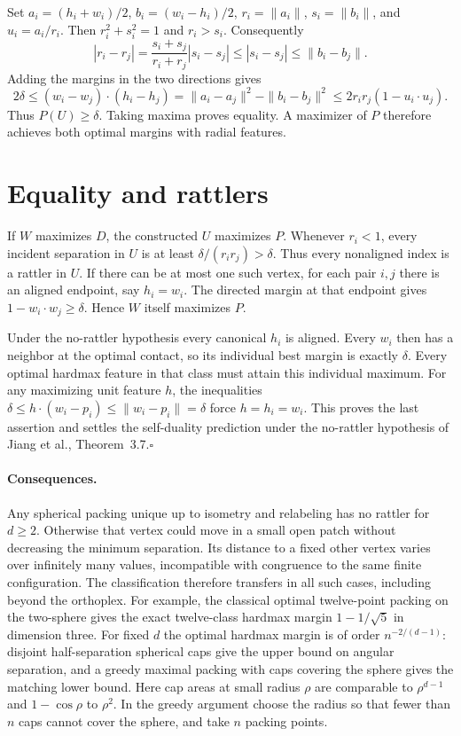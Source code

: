 \documentclass[11pt]{article}
\begin{document}
Set $a_i=(h_i+w_i)/2$, $b_i=(w_i-h_i)/2$, $r_i=\|a_i\|$, $s_i=\|b_i\|$, and $u_i=a_i/r_i$. Then $r_i^2+s_i^2=1$ and $r_i>s_i$. Consequently
\[
 |r_i-r_j|=\frac{s_i+s_j}{r_i+r_j}|s_i-s_j|
 \le |s_i-s_j|\le\|b_i-b_j\|.
\]
Adding the margins in the two directions gives
\[
 2\delta\le (w_i-w_j)\cdot(h_i-h_j)
 =\|a_i-a_j\|^2-\|b_i-b_j\|^2
 \le 2r_i r_j(1-u_i\cdot u_j).
\]
Thus $P(U)\ge\delta$. Taking maxima proves equality. A maximizer of $P$ therefore achieves both optimal margins with radial features.

\section*{Equality and rattlers}
If $W$ maximizes $D$, the constructed $U$ maximizes $P$. Whenever $r_i<1$, every incident separation in $U$ is at least $\delta/(r_ir_j)>\delta$. Thus every nonaligned index is a rattler in $U$. If there can be at most one such vertex, for each pair $i,j$ there is an aligned endpoint, say $h_i=w_i$. The directed margin at that endpoint gives $1-w_i\cdot w_j\ge\delta$. Hence $W$ itself maximizes $P$.

Under the no-rattler hypothesis every canonical $h_i$ is aligned. Every $w_i$ then has a neighbor at the optimal contact, so its individual best margin is exactly $\delta$. Every optimal hardmax feature in that class must attain this individual maximum. For any maximizing unit feature $h$, the inequalities $\delta\le h\cdot(w_i-p_i)\le\|w_i-p_i\|=\delta$ force $h=h_i=w_i$. This proves the last assertion and settles the self-duality prediction under the no-rattler hypothesis of Jiang et al., Theorem~3.7.\hfill$\square$

\paragraph{Consequences.} Any spherical packing unique up to isometry and relabeling has no rattler for $d\ge2$. Otherwise that vertex could move in a small open patch without decreasing the minimum separation. Its distance to a fixed other vertex varies over infinitely many values, incompatible with congruence to the same finite configuration. The classification therefore transfers in all such cases, including beyond the orthoplex. For example, the classical optimal twelve-point packing on the two-sphere gives the exact twelve-class hardmax margin $1-1/\sqrt5$ in dimension three. For fixed $d$ the optimal hardmax margin is of order $n^{-2/(d-1)}$: disjoint half-separation spherical caps give the upper bound on angular separation, and a greedy maximal packing with caps covering the sphere gives the matching lower bound. Here cap areas at small radius $\rho$ are comparable to $\rho^{d-1}$ and $1-\cos\rho$ to $\rho^2$. In the greedy argument choose the radius so that fewer than $n$ caps cannot cover the sphere, and take $n$ packing points.
\end{document}
